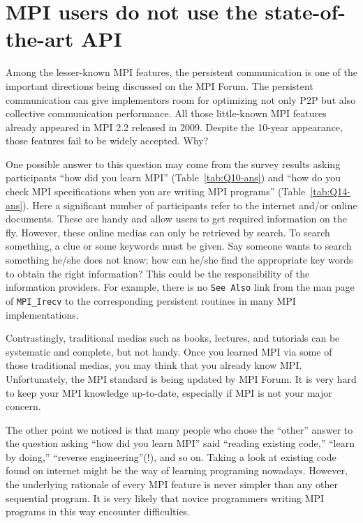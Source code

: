 \documentclass[sigconf,nonacm]{acmart}
\begin{document}
\section{MPI users do not use the state-of-the-art API}

Among the lesser-known MPI features, the persistent communication is
one of the important directions being discussed on the MPI Forum\cite{mpi-forum}.
The persistent communication can give implementors room for
optimizing not only P2P but also collective communication
performance.
All those little-known MPI features already appeared in MPI 2.2
released in 2009. Despite the 10-year appearance, those features
fail to be widely accepted.  Why?

One possible answer to this question may come from the survey results
asking participants ``how did you learn MPI''
(Table~\ref{tab:Q10-ans}) and ``how do you check
MPI specifications when you are writing MPI programs''
(Table~\ref{tab:Q14-ans}).
Here a significant number of participants refer to the internet
and/or online documents. These are handy and allow users to get
required information on the fly. However,
these online medias can only be retrieved by
search. To search something, a clue or some keywords must be given.
Say someone wants to search something he/she does not know; how can he/she
find the appropriate key words to obtain the right information?
This could be the responsibility of the information providers. For example,
there is no {\tt See Also} link from the man page of {\tt MPI\_Irecv}
to the corresponding persistent routines in many MPI implementations.

Contrastingly, traditional medias such as books, lectures, and tutorials can be
systematic and complete, but not handy.  Once you learned MPI via some
of those traditional medias, you may think that you already know
MPI. Unfortunately, the MPI standard is being updated by MPI Forum. It is
very hard to keep your MPI knowledge up-to-date, especially if MPI is not
your major concern.

The other point we noticed is that many people who chose the ``other''
answer to the question asking ``how did you learn MPI'' said
``reading existing code,'' ``learn by doing,'' ``reverse
engineering''(!),  and so on. Taking a look at existing code found on
internet might be the way of learning programing nowadays. However,
the underlying rationale of every MPI feature is never simpler than
any other sequential program. It is very likely that novice
programmers writing MPI programs in this way encounter difficulties.
\end{document}
